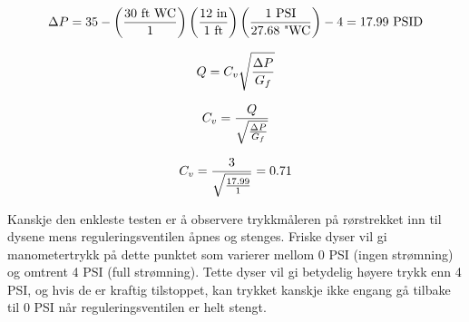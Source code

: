$$\Delta P = 35 - \left(30 \hbox{ ft WC} \over 1 \right)  \left(12 \hbox{ in} \over 1 \hbox{ ft}\right)  \left(1 \hbox{ PSI} \over 27.68 \hbox{ "WC} \right) - 4 = 17.99 \hbox{ PSID}$$

$$Q = C_v \sqrt{\Delta P \over G_f}$$

$$C_v = {Q \over \sqrt{\Delta P \over G_f}}$$

$$C_v = {3 \over \sqrt{17.99 \over 1}} = 0.71$$


\vskip 10pt

Kanskje den enkleste testen er å observere trykkmåleren på rørstrekket inn til dysene mens reguleringsventilen åpnes og stenges. Friske dyser vil gi manometertrykk på dette punktet som varierer mellom 0 PSI (ingen strømning) og omtrent 4 PSI (full strømning). Tette dyser vil gi betydelig høyere trykk enn 4 PSI, og hvis de er kraftig tilstoppet, kan trykket kanskje ikke engang gå tilbake til 0 PSI når reguleringsventilen er helt stengt.



